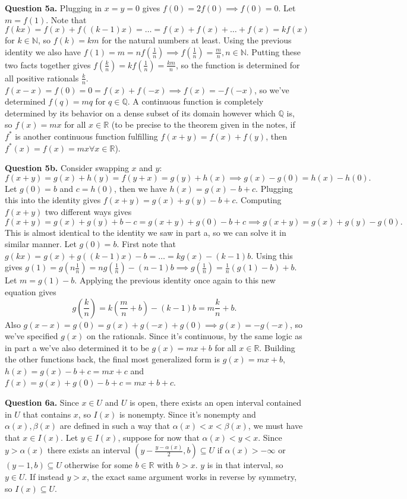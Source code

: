 \documentclass[letterpaper, reqno,11pt]{article}
\begin{document}
\newpage\phantom{blabla}
\newpage

{\medskip\noindent\bf Question 5a.} Plugging in $x=y=0$ gives $f(0)=2f(0)\implies f(0)=0$. Let $m=f(1)$. Note that $f(kx)=f(x)+f((k-1)x)=\ldots=f(x)+f(x)+\ldots+f(x)=kf(x)$ for $k\in \mathbb{N}$, so $f(k)=km$ for the natural numbers at least. Using the previous identity we also have $f(1)=m=nf(\frac{1}{n})\implies f(\frac{1}{n})=\frac{m}{n}, n\in \mathbb{N}$. Putting these two facts together gives $f(\frac{k}{n})=kf(\frac{1}{n})=\frac{km}{n}$, so the function is determined for all positive rationals $\frac{k}{n}$. $f(x-x)=f(0)=0=f(x)+f(-x)\implies f(x)=-f(-x)$, so we've determined $f(q)=mq$ for $q\in\mathbb{Q}$. A continuous function is completely determined by its behavior on a dense subset of its domain however which $\mathbb{Q}$ is, so $f(x)=mx$ for all $x\in \mathbb{R}$ (to be precise to the theorem given in the notes, if $f^{*}$ is another continuous function fulfilling $f(x+y)=f(x)+f(y)$, then $f^{*}(x)=f(x)=mx\forall x\in \mathbb{R}$).

{\medskip\noindent\bf Question 5b.} Consider swapping $x$ and $y$:
\[
f(x+y)=g(x)+h(y)=f(y+x)=g(y)+h(x)\implies g(x)-g(0)=h(x)-h(0)
.\]
Let $g(0)=b$ and $c=h(0)$, then we have $h(x)=g(x)-b+c$. Plugging this into the identity gives $f(x+y)=g(x)+g(y)-b+c$. Computing $f(x+y)$ two different ways gives
\[
f(x+y)=g(x)+g(y)+b-c=g(x+y)+g(0)-b+c\implies g(x+y)=g(x)+g(y)-g(0)
.\]
This is almost identical to the identity we saw in part a, so we can solve it in similar manner. Let $g(0)=b$. First note that $g(kx)=g(x)+g((k-1)x)-b=\ldots=kg(x)-(k-1)b$. Using this gives $g(1)=g(n \frac{1}{n})=ng(\frac{1}{n})-(n-1)b\implies g(\frac{1}{n})=\frac{1}{n}(g(1)-b)+b$. Let $m=g(1)-b$. Applying the previous identity once again to this new equation gives 
\[
    g\left(\frac{k}{n}\right)=k\left( \frac{m}{n}+b \right)-(k-1)b=m \frac{k}{n}+b
.\]
Also $g(x-x)=g(0)=g(x)+g(-x)+g(0)\implies g(x)=-g(-x)$, so we've specified $g(x)$ on the rationals. Since it's continuous, by the same logic as in part a we've also determined it to be $g(x)=mx+b$ for all $x\in \mathbb{R}$. Building the other functions back, the final most generalized form is $g(x)=mx+b$, $h(x)=g(x)-b+c=mx+c$ and $f(x)=g(x)+g(0)-b+c=mx+b+c$.

\newpage\phantom{blabla}
\newpage

{\medskip\noindent\bf Question 6a.} Since $x\in U$ and $U$ is open, there exists an open interval contained in $U$ that contains $x$, so $I(x)$ is nonempty. Since it's nonempty and $\alpha(x),\beta(x)$ are defined in such a way that $\alpha(x)<x<\beta(x)$, we must have that $x\in I(x)$. Let $y\in I(x)$, suppose for now that $\alpha(x)<y<x$. Since $y>\alpha(x)$ there exists an interval $\left(y-\frac{y-\alpha(x)}{2},b\right)\subseteq U$ if $\alpha(x)>-\infty$ or $(y-1,b)\subseteq U$ otherwise for some $b\in \mathbb{R}$ with $b>x$. $y$ is in that interval, so $y\in U$. If instead $y>x$, the exact same argument works in reverse by symmetry, so $I(x)\subseteq U$.
\end{document}
